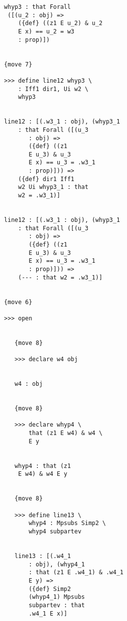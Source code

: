 \documentclass[12pt]{article}
\begin{document}
\begin{verbatim}
                     whyp3 : that Forall 
                      ([(u_2 : obj) => 
                         ({def} ((z1 E u_2) & u_2 
                         E x) == u_2 = w3 
                         : prop)])


                     {move 7}

                     >>> define line12 whyp3 \
                         : Iff1 dir1, Ui w2 \
                         whyp3


                     line12 : [(.w3_1 : obj), (whyp3_1 
                         : that Forall ([(u_3 
                            : obj) => 
                            ({def} ((z1 
                            E u_3) & u_3 
                            E x) == u_3 = .w3_1 
                            : prop)])) => 
                         ({def} dir1 Iff1 
                         w2 Ui whyp3_1 : that 
                         w2 = .w3_1)]


                     line12 : [(.w3_1 : obj), (whyp3_1 
                         : that Forall ([(u_3 
                            : obj) => 
                            ({def} ((z1 
                            E u_3) & u_3 
                            E x) == u_3 = .w3_1 
                            : prop)])) => 
                         (--- : that w2 = .w3_1)]


                     {move 6}

                     >>> open


                        {move 8}

                        >>> declare w4 obj


                        w4 : obj


                        {move 8}

                        >>> declare whyp4 \
                            that (z1 E w4) & w4 \
                            E y


                        whyp4 : that (z1 
                         E w4) & w4 E y


                        {move 8}

                        >>> define line13 \
                            whyp4 : Mpsubs Simp2 \
                            whyp4 subpartev


                        line13 : [(.w4_1 
                            : obj), (whyp4_1 
                            : that (z1 E .w4_1) & .w4_1 
                            E y) => 
                            ({def} Simp2 
                            (whyp4_1) Mpsubs 
                            subpartev : that 
                            .w4_1 E x)]



\end{verbatim}
\end{document}
